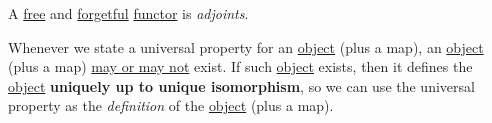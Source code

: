 \begin{definition}\label{def:adjoint-functor}
	A \hyperref[eg:free-functor]{free} and \hyperref[eg:forgetful-functor]{forgetful} \hyperref[def:functor]{functor} is \emph{adjoints}.
\end{definition}
\begin{remark}
	Whenever we state a universal property for an \hyperref[def:object]{object} (plus a map), an
	\hyperref[def:object]{object} (plus a map) \underline{may or may not} exist.
	If such \hyperref[def:object]{object} exists, then it defines the
	\hyperref[def:object]{object} \textbf{uniquely up to unique isomorphism}, so we can use the universal
	property as the \emph{definition} of the \hyperref[def:object]{object} (plus a map).
\end{remark}


